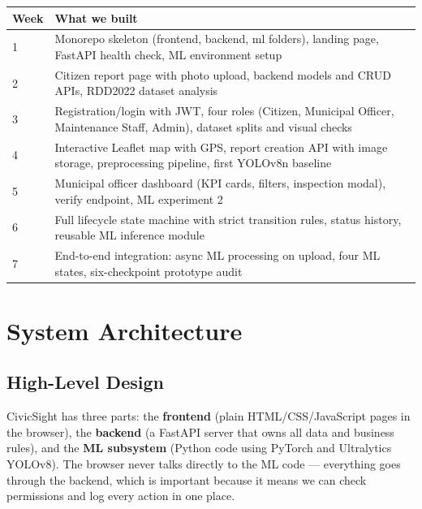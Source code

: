 \documentclass{tietreport}
\begin{document}
\begin{longtable}{|p{1.6cm}|p{11.6cm}|}
\hline
\textbf{Week} & \textbf{What we built} \\
\hline
1 & Monorepo skeleton (frontend, backend, ml folders), landing page, FastAPI health check, ML environment setup \\
\hline
2 & Citizen report page with photo upload, backend models and CRUD APIs, RDD2022 dataset analysis \\
\hline
3 & Registration/login with JWT, four roles (Citizen, Municipal Officer, Maintenance Staff, Admin), dataset splits and visual checks \\
\hline
4 & Interactive Leaflet map with GPS, report creation API with image storage, preprocessing pipeline, first YOLOv8n baseline \\
\hline
5 & Municipal officer dashboard (KPI cards, filters, inspection modal), verify endpoint, ML experiment 2 \\
\hline
6 & Full lifecycle state machine with strict transition rules, status history, reusable ML inference module \\
\hline
7 & End-to-end integration: async ML processing on upload, four ML states, six-checkpoint prototype audit \\
\hline
\end{longtable}


\clearpage
\section{System Architecture}

\subsection{High-Level Design}

CivicSight has three parts: the \textbf{frontend} (plain HTML/CSS/JavaScript pages in the browser), the \textbf{backend} (a FastAPI server that owns all data and business rules), and the \textbf{ML subsystem} (Python code using PyTorch and Ultralytics YOLOv8). The browser never talks directly to the ML code --- everything goes through the backend, which is important because it means we can check permissions and log every action in one place.
\end{document}
